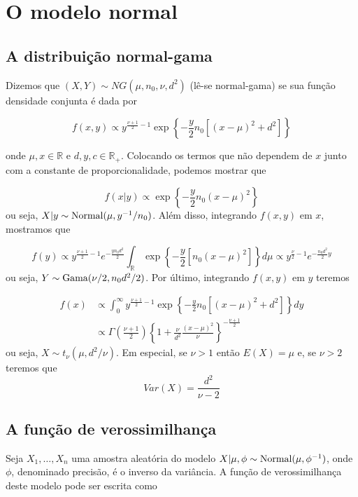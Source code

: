 \documentclass[
  letterpaper,
  DIV=11,
  numbers=noendperiod]{scrreprt}
\theoremstyle{definition}
\theoremstyle{definition}
\theoremstyle{plain}
\theoremstyle{remark}
\begin{document}

\chapter{O modelo normal}\label{o-modelo-normal}

\section{A distribuição
normal-gama}\label{a-distribuiuxe7uxe3o-normal-gama}

Dizemos que \((X,Y)\sim NG(\mu,n_0,\nu,d^2)\) (lê-se normal-gama) se sua
função densidade conjunta é dada por

\[f(x,y)\propto y^{\frac{\nu+1}{2}-1}\exp\left\{-\frac{y}{2}n_0\left[(x-\mu)^2 + d^2\right]\right\}\]

onde \(\mu,x\in\mathbb{R}\) e \(d,y,c\in\mathbb{R}_+\). Colocando os
termos que não dependem de \(x\) junto com a constante de
proporcionalidade, podemos mostrar que

\[f(x|y)\propto \exp\left\{-\frac{y}{2}n_0(x-\mu)^2\right\}\] ou seja,
\(X|y\sim\hbox{Normal}(\mu,y^{-1}/n_0)\). Além disso, integrando
\(f(x,y)\) em \(x\), mostramos que

\[f(y)\propto y^{\frac{\nu+1}{2}-1}e^{-\frac{yn_0d^2}{2}}\int_{\mathbb{R}}\exp\left\{-\frac{y}{2}\left[n_0(x-\mu)^2\right]\right\}d\mu\propto y^{\frac{\nu}{2}-1}e^{-\frac{n_0d^2}{2}y}\]
ou seja, \(Y\sim\hbox{Gama}(\nu/2, n_0d^2/2)\). Por último, integrando
\(f(x,y)\) em \(y\) teremos

\[\begin{align}f(x)&\propto \int_0^\infty y^{\frac{\nu+1}{2}-1}\exp\left\{-\frac{y}{2}n_0\left[(x-\mu)^2 + d^2\right]\right\}dy \\&\propto \Gamma\left(\frac{\nu+1}{2}\right)\left\{1+\frac{\nu}{d^2}\frac{(x-\mu)^2}{\nu}\right\}^{-\frac{\nu+1}{2}}\end{align}\]
ou seja, \(X\sim t_{\nu}(\mu, d^2/\nu)\). Em especial, se \(\nu>1\)
então \(E(X)=\mu\) e, se \(\nu>2\) teremos que
\[Var(X)=\frac{d^2}{\nu-2}\]

\section{A função de
verossimilhança}\label{a-funuxe7uxe3o-de-verossimilhanuxe7a-1}

Seja \(X_1,\ldots,X_n\) uma amostra aleatória do modelo
\(X|\mu,\phi\sim\hbox{Normal}(\mu,\phi^{-1})\), onde \(\phi\),
denominado precisão, é o inverso da variância. A função de
verossimilhança deste modelo pode ser escrita como
\end{document}
